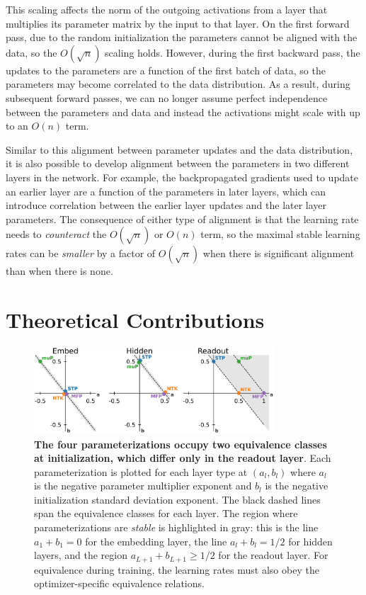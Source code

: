 \documentclass{article}
\theoremstyle{plain}
\theoremstyle{definition}
\theoremstyle{remark}
\begin{document}
This scaling affects the norm of the outgoing activations from a layer that multiplies its parameter matrix by the input to that layer. On the first forward pass, due to the random initialization the parameters cannot be aligned with the data, so the $O(\sqrt{n})$ scaling holds. However, during the first backward pass, the updates to the parameters are a function of the first batch of data, so the parameters may become correlated to the data distribution. As a result, during subsequent forward passes, we can no longer assume perfect independence between the parameters and data and instead the activations might scale with up to an $O(n)$ term.

Similar to this alignment between parameter updates and the data distribution, it is also possible to develop alignment between the parameters in two different layers in the network. For example, the backpropagated gradients used to update an earlier layer are a function of the parameters in later layers, which can introduce correlation between the earlier layer updates and the later layer parameters. The consequence of either type of alignment is that the learning rate needs to \emph{counteract} the $O(\sqrt{n})$ or $O(n)$ term, so the maximal stable learning rates can be \emph{smaller} by a factor of $O(\sqrt{n})$ when there is significant alignment than when there is none.



\section{Theoretical Contributions}
\label{sec:theory}

\begin{figure}[ht!]
    \centering
    \includegraphics[width=0.8\textwidth]{icml2024/figures/theory/equivalence_classes.pdf}
    \caption{\textbf{The four parameterizations occupy two equivalence classes at initialization, which differ only in the readout layer}. Each parameterization is plotted for each layer type at $(a_l, b_l)$ where $a_l$ is the negative parameter multiplier exponent and $b_l$ is the negative initialization standard deviation exponent. The black dashed lines span the equivalence classes for each layer. The region where parameterizations are \emph{stable} is highlighted in gray: this is the line $a_1 + b_1 = 0$ for the embedding layer, the line $a_l + b_l = 1/2$ for hidden layers, and the region $a_{L+1} + b_{L+1} \geq 1/2$ for the readout layer. For equivalence during training, the learning rates must also obey the optimizer-specific equivalence relations.}
    \label{fig:equivalence_classes}
\end{figure}
\end{document}
